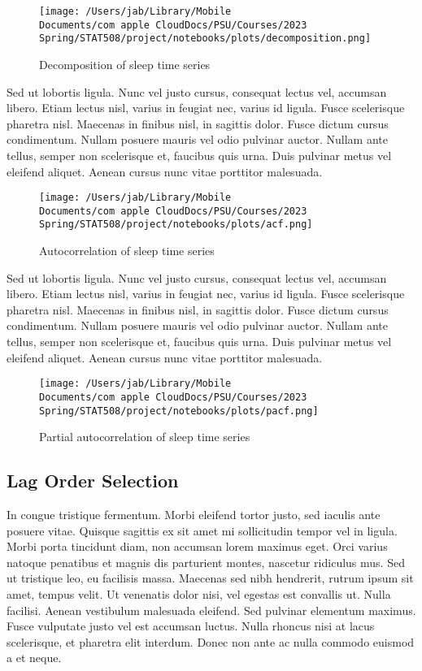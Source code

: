 \documentclass{article}
\begin{document}
\begin{figure}[h]
\centering
  \texttt{[image: /Users/jab/Library/Mobile Documents/com~apple~CloudDocs/PSU/Courses/2023 Spring/STAT508/project/notebooks/plots/decomposition.png]}
\caption{Decomposition of sleep time series}
\end{figure}

Sed ut lobortis ligula. Nunc vel justo cursus, consequat lectus vel,
accumsan libero. Etiam lectus nisl, varius in feugiat nec, varius id
ligula. Fusce scelerisque pharetra nisl. Maecenas in finibus nisl, in
sagittis dolor. Fusce dictum cursus condimentum. Nullam posuere mauris
vel odio pulvinar auctor. Nullam ante tellus, semper non scelerisque et,
faucibus quis urna. Duis pulvinar metus vel eleifend aliquet. Aenean
cursus nunc vitae porttitor malesuada.

\begin{figure}[h]
\centering
  \texttt{[image: /Users/jab/Library/Mobile Documents/com~apple~CloudDocs/PSU/Courses/2023 Spring/STAT508/project/notebooks/plots/acf.png]}
\caption{Autocorrelation of sleep time series}
\end{figure}

Sed ut lobortis ligula. Nunc vel justo cursus, consequat lectus vel,
accumsan libero. Etiam lectus nisl, varius in feugiat nec, varius id
ligula. Fusce scelerisque pharetra nisl. Maecenas in finibus nisl, in
sagittis dolor. Fusce dictum cursus condimentum. Nullam posuere mauris
vel odio pulvinar auctor. Nullam ante tellus, semper non scelerisque et,
faucibus quis urna. Duis pulvinar metus vel eleifend aliquet. Aenean
cursus nunc vitae porttitor malesuada.

\begin{figure}[h]
\centering
  \texttt{[image: /Users/jab/Library/Mobile Documents/com~apple~CloudDocs/PSU/Courses/2023 Spring/STAT508/project/notebooks/plots/pacf.png]}
\caption{Partial autocorrelation of sleep time series}
\end{figure}

\hypertarget{lag-order-selection}{%
\subsection{Lag Order Selection}\label{lag-order-selection}}

In congue tristique fermentum. Morbi eleifend tortor justo, sed iaculis
ante posuere vitae. Quisque sagittis ex sit amet mi sollicitudin tempor
vel in ligula. Morbi porta tincidunt diam, non accumsan lorem maximus
eget. Orci varius natoque penatibus et magnis dis parturient montes,
nascetur ridiculus mus. Sed ut tristique leo, eu facilisis massa.
Maecenas sed nibh hendrerit, rutrum ipsum sit amet, tempus velit. Ut
venenatis dolor nisi, vel egestas est convallis ut. Nulla facilisi.
Aenean vestibulum malesuada eleifend. Sed pulvinar elementum maximus.
Fusce vulputate justo vel est accumsan luctus. Nulla rhoncus nisi at
lacus scelerisque, et pharetra elit interdum. Donec non ante ac nulla
commodo euismod a et neque.
\end{document}

